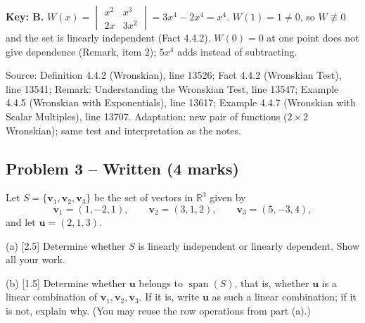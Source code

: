 \documentclass[11pt,a4paper]{article}
\newcommand{\Src}[1]{{\footnotesize\color{black!65}Source: #1}}
\begin{document}
\textbf{Key: B.} $W(x)=\begin{vmatrix}x^{2}&x^{3}\\2x&3x^{2}\end{vmatrix}=3x^{4}-2x^{4}=x^{4}$. $W(1)=1\neq0$, so $W\not\equiv0$ and the set is linearly independent (Fact 4.4.2). $W(0)=0$ at one point does not give dependence (Remark, item 2); $5x^4$ adds instead of subtracting.\par
\Src{Definition 4.4.2 (Wronskian), line 13526; Fact 4.4.2 (Wronskian Test), line 13541; Remark: Understanding the Wronskian Test, line 13547; Example 4.4.5 (Wronskian with Exponentials), line 13617; Example 4.4.7 (Wronskian with Scalar Multiples), line 13707. Adaptation: new pair of functions ($2\times2$ Wronskian); same test and interpretation as the notes.}\par
\subsection*{Problem 3 -- Written (4 marks)}
Let $S=\{\mathbf{v}_1,\mathbf{v}_2,\mathbf{v}_3\}$ be the set of vectors in $\mathbb{R}^3$ given by\[\mathbf{v}_1=(1,-2,1),\qquad \mathbf{v}_2=(3,1,2),\qquad \mathbf{v}_3=(5,-3,4),\]and let $\mathbf{u}=(2,1,3)$.\par (a) [2.5] Determine whether $S$ is linearly independent or linearly dependent. Show all your work.\par (b) [1.5] Determine whether $\mathbf{u}$ belongs to $\operatorname{span}(S)$, that is, whether $\mathbf{u}$ is a linear combination of $\mathbf{v}_1,\mathbf{v}_2,\mathbf{v}_3$. If it is, write $\mathbf{u}$ as such a linear combination; if it is not, explain why. (You may reuse the row operations from part (a).)\par
\end{document}
